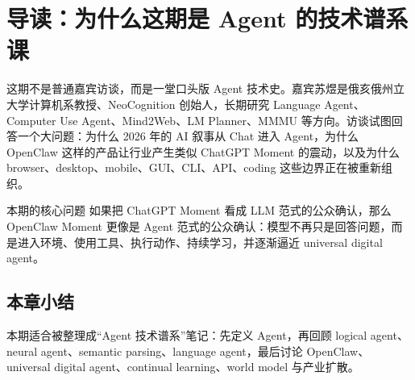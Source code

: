 \section{导读：为什么这期是 Agent 的技术谱系课}

这期不是普通嘉宾访谈，而是一堂口头版 Agent 技术史。嘉宾苏煜是俄亥俄州立大学计算机系教授、NeoCognition 创始人，长期研究 Language Agent、Computer Use Agent、Mind2Web、LM Planner、MMMU 等方向。访谈试图回答一个大问题：为什么 2026 年的 AI 叙事从 Chat 进入 Agent，为什么 OpenClaw 这样的产品让行业产生类似 ChatGPT Moment 的震动，以及为什么 browser、desktop、mobile、GUI、CLI、API、coding 这些边界正在被重新组织。

\begin{importantbox}{本期的核心问题}
如果把 ChatGPT Moment 看成 LLM 范式的公众确认，那么 OpenClaw Moment 更像是 Agent 范式的公众确认：模型不再只是回答问题，而是进入环境、使用工具、执行动作、持续学习，并逐渐逼近 universal digital agent。
\end{importantbox}




\subsection{本章小结}

本期适合被整理成“Agent 技术谱系”笔记：先定义 Agent，再回顾 logical agent、neural agent、semantic parsing、language agent，最后讨论 OpenClaw、universal digital agent、continual learning、world model 与产业扩散。

